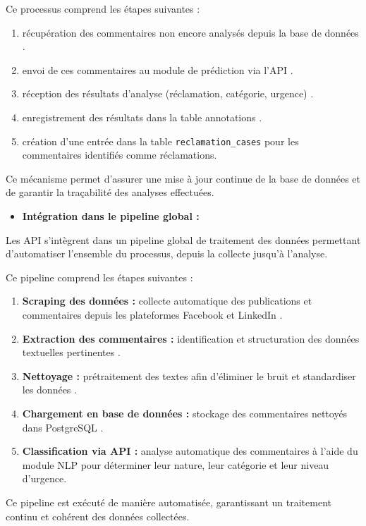 \documentclass[12pt,a4paper,oneside]{report}
\begin{document}
Ce processus comprend les étapes suivantes :

\begin{enumerate}
    \item récupération des commentaires non encore analysés depuis la base de données .
    \item envoi de ces commentaires au module de prédiction via l’API .
    \item réception des résultats d’analyse (réclamation, catégorie, urgence) .
    \item enregistrement des résultats dans la table annotations .
    \item création d’une entrée dans la table \texttt{reclamation\_cases} pour les commentaires identifiés comme réclamations.
\end{enumerate}

Ce mécanisme permet d’assurer une mise à jour continue de la base de données et de garantir la traçabilité des analyses effectuées.

\begin{itemize}
    \item \textbf{Intégration dans le pipeline global :}
\end{itemize}
\vspace{0.3cm}
Les API s’intègrent dans un pipeline global de traitement des données permettant d’automatiser l’ensemble du processus, depuis la collecte jusqu’à l’analyse.

Ce pipeline comprend les étapes suivantes :

\begin{enumerate}
    \item \textbf{Scraping des données :} collecte automatique des publications et commentaires depuis les plateformes Facebook et LinkedIn .
    \item \textbf{Extraction des commentaires :} identification et structuration des données textuelles pertinentes .
    \item \textbf{Nettoyage :} prétraitement des textes afin d’éliminer le bruit et standardiser les données .
    \item \textbf{Chargement en base de données :} stockage des commentaires nettoyés dans PostgreSQL .
    \item \textbf{Classification via API :} analyse automatique des commentaires à l’aide du module NLP pour déterminer leur nature, leur catégorie et leur niveau d’urgence.
\end{enumerate}

Ce pipeline est exécuté de manière automatisée, garantissant un traitement continu et cohérent des données collectées.
\end{document}
